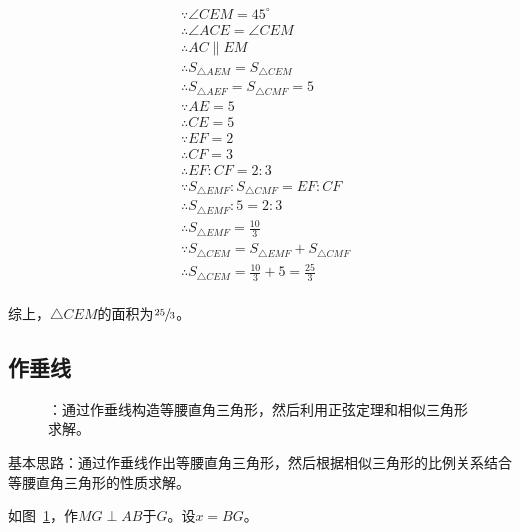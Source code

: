 \begin{align*}
  &\because   \angle CEM = 45^\circ \\
  &\therefore \angle ACE = \angle CEM \\
  &\therefore AC \parallel EM \\
  &\therefore S_{\triangle AEM} = S_{\triangle CEM} \\
  &\therefore S_{\triangle AEF} = S_{\triangle CMF} = 5 \\
  &\because   AE = 5 \\
  &\therefore CE = 5 \\
  &\because   EF = 2 \\
  &\therefore CF = 3 \\
  &\therefore EF:CF = 2:3 \\
  &\because   S_{\triangle EMF}:S_{\triangle CMF} = EF:CF \\
  &\therefore S_{\triangle EMF}:5 = 2:3 \\
  &\therefore S_{\triangle EMF} = \frac{10}3 \\
  &\because   S_{\triangle CEM} = S_{\triangle EMF} + S_{\triangle CMF} \\
  &\therefore S_{\triangle CEM} = \frac{10}3 + 5 = \frac{25}3 \\
\end{align*}

综上，$\triangle CEM$的面积为$\sfrac{25}3$。

\subsection{作垂线} \label{subsec:0016-vert}

\begin{figure}[htbp]
  \centering
  \caption{：通过作垂线构造等腰直角三角形，然后利用正弦定理和相似三角形求解。}
  \label{fig:0016-vert}
\end{figure}

基本思路：通过作垂线作出等腰直角三角形，然后根据相似三角形的比例关系结合等腰直角三角形的性质求解。

如图~\ref{fig:0016-vert}，作$MG \perp AB$于$G$。设$x = BG$。

